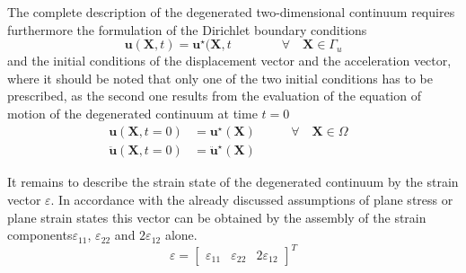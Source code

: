 The complete description of the degenerated two-dimensional continuum requires furthermore the formulation of the Dirichlet boundary conditions
\begin{equation}
\label{eqn:3.8}
 \boldsymbol{u}(\boldsymbol{X}, t)=\boldsymbol{u}^{\star}(\boldsymbol{X}, t\qquad \qquad \forall \quad \boldsymbol{X} \in \Gamma_{u} 
\end{equation}
and the initial conditions of the displacement vector and the acceleration vector, where it should
be noted that only one of the two initial conditions has to be prescribed, as the second one results
from the evaluation of the equation of motion of the degenerated continuum at time $t = 0$
\begin{equation}
\label{eqn:3.9}
 \begin{aligned} \boldsymbol{u}(\boldsymbol{X}, t=0) &=\boldsymbol{u}^{\star}(\boldsymbol{X}) & \qquad \forall \quad \boldsymbol{X} \in \Omega \\ \ddot{\boldsymbol{u}}(\boldsymbol{X}, t=0) &=\ddot{\boldsymbol{u}}^{\star}(\boldsymbol{X}) & & \end{aligned} 
\end{equation}

It remains to describe the strain state of the degenerated continuum by the strain vector $\varepsilon$. In
accordance with the already discussed assumptions of plane stress or plane strain states this
vector can be obtained by the assembly of the strain components$\varepsilon_{ 11 }$, $\varepsilon_ {22}$ and $2\varepsilon_ {12}$ alone.
\begin{equation}
\label{eqn:3.10}
 \varepsilon=\left[\begin{array}{lll}\varepsilon_{11} & \varepsilon_{22} & 2 \varepsilon_{12}\end{array}\right]^{T} 
\end{equation}

